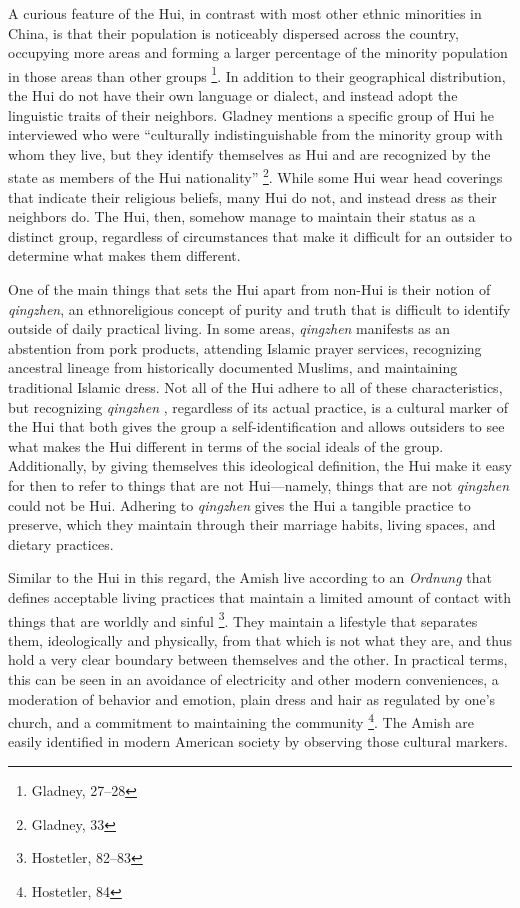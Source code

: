 A curious feature of the Hui, in contrast with most other ethnic minorities in
China, is that their population is noticeably dispersed across the country,
occupying more areas and forming a larger percentage of the minority population
in those areas than other groups \footnote{Gladney, 27--28}. In addition to
their geographical distribution, the Hui do not have their own language or
dialect, and instead adopt the linguistic traits of their neighbors. Gladney
mentions a specific group of Hui he interviewed who were ``culturally
indistinguishable from the minority group with whom they live, but they
identify themselves as Hui and are recognized by the state as members of the
Hui nationality'' \footnote{Gladney, 33}. While some Hui wear head coverings
that indicate their religious beliefs, many Hui do not, and instead dress as
their neighbors do. The Hui, then, somehow manage to maintain their status as a
distinct group, regardless of circumstances that
make it difficult for an outsider to determine what makes them different.

One of the main things that sets the Hui apart from non-Hui is their notion of
\textit{qingzhen}, an ethnoreligious concept of purity and truth that is
difficult to identify outside of daily practical living. In some areas,
\textit{qingzhen} manifests as an abstention from pork products, attending
Islamic prayer services, recognizing ancestral lineage from historically
documented Muslims, and maintaining traditional Islamic dress. Not all of the
Hui adhere to all of these characteristics, but recognizing \textit{qingzhen}
, regardless of its actual practice, is a cultural marker of the Hui that both
gives the group a self-identification and allows outsiders to see what makes the Hui different in terms of
 the social ideals of the group. Additionally, by giving themselves this
ideological definition, the Hui make it easy for then to refer to things that
are not Hui---namely, things that are not \textit{qingzhen} could not be Hui.
Adhering to \textit{qingzhen} gives the Hui a tangible practice to preserve,
which they maintain through their marriage habits, living spaces, and dietary
practices.

Similar to the Hui in this regard, the Amish live according to an
\textit{Ordnung} that defines acceptable living practices that maintain a
limited amount of contact with things that are worldly and sinful
\footnote{Hostetler, 82--83}. They maintain a lifestyle that separates them,
ideologically and physically, from that which is not what they are, and thus
hold a very clear boundary between themselves and the other. In practical
terms, this can be seen in an avoidance of electricity and other modern
conveniences, a moderation of behavior and emotion, plain dress and hair as
regulated by one's church, and a commitment to maintaining the community
\footnote{Hostetler, 84}. The Amish are easily identified in modern American
society by observing those cultural markers.

